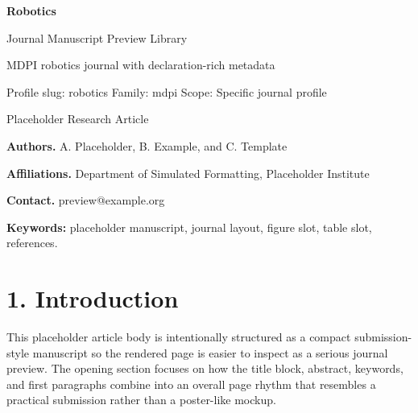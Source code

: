 \documentclass[10pt,a4paper]{article}
\begin{document}
\begin{center}
{\LARGE\bfseries Robotics}\par
\vspace{0.25em}
{\small Journal Manuscript Preview Library}\par
\vspace{0.15em}
{\footnotesize MDPI robotics journal with declaration-rich metadata}\par
\vspace{0.2em}
{\footnotesize Profile slug: robotics \quad Family: mdpi \quad Scope: Specific journal profile}
\end{center}
\vspace{0.2em}
 Placeholder Research Article\par\vspace{0.4em}


\noindent\textbf{Authors.} A. Placeholder, B. Example, and C. Template\par
\noindent\textbf{Affiliations.} Department of Simulated Formatting, Placeholder Institute\par
\noindent\textbf{Contact.} preview@example.org\par
\vspace{0.4em}
\par\vspace{0.6em}
\noindent\textbf{Keywords:} placeholder manuscript, journal layout, figure slot, table slot, references.\par\vspace{0.6em}


\small
\section*{1. Introduction}
This placeholder article body is intentionally structured as a compact submission-style manuscript so the rendered page is easier to inspect as a serious journal preview. The opening section focuses on how the title block, abstract, keywords, and first paragraphs combine into an overall page rhythm that resembles a practical submission rather than a poster-like mockup.
\end{document}

